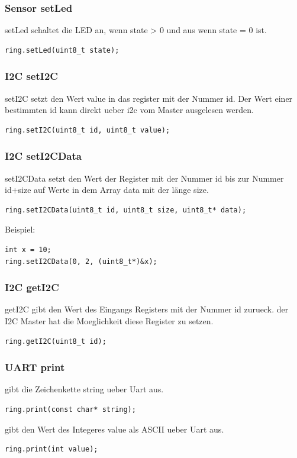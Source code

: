 \documentclass{article}
\begin{document}
\subsubsection{Sensor setLed}
setLed schaltet die LED an, wenn state > 0 und aus wenn state = 0 ist.
\begin{lstlisting}
ring.setLed(uint8_t state);
\end{lstlisting}


\subsubsection{I2C setI2C}
setI2C setzt den Wert value in das register mit der Nummer id.
Der Wert einer bestimmten id kann direkt ueber i2c vom Master ausgelesen werden.
\begin{lstlisting}
ring.setI2C(uint8_t id, uint8_t value);
\end{lstlisting}


\subsubsection{I2C setI2CData}
setI2CData setzt den Wert der Register mit der Nummer id bis zur Nummer id+size 
auf Werte in dem Array data mit der länge size.
\begin{lstlisting}
ring.setI2CData(uint8_t id, uint8_t size, uint8_t* data);
\end{lstlisting}
Beispiel:
\begin{lstlisting}
int x = 10; 
ring.setI2CData(0, 2, (uint8_t*)&x);
\end{lstlisting}


\subsubsection{I2C getI2C}
getI2C gibt den Wert des Eingangs Registers mit der Nummer id zurueck.
der I2C Master hat die Moeglichkeit diese Register zu setzen.
\begin{lstlisting}
ring.getI2C(uint8_t id);
\end{lstlisting}



\subsubsection{UART print}
gibt die Zeichenkette string ueber Uart aus.
\begin{lstlisting}
ring.print(const char* string);
\end{lstlisting}
gibt den Wert des Integeres value als ASCII ueber Uart aus.
\begin{lstlisting}
ring.print(int value);
\end{lstlisting}
\end{document}

